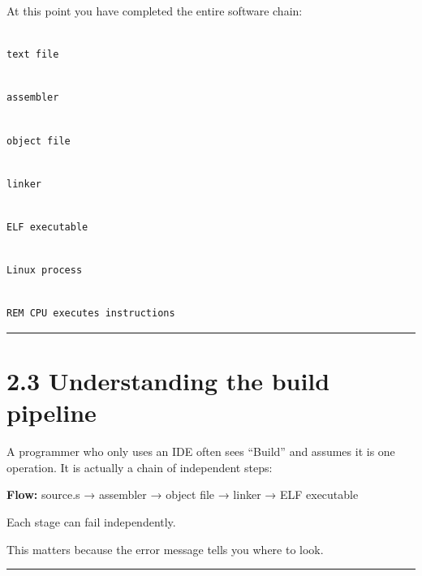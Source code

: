 \documentclass[
  oneside,
  openany]{book}
\begin{document}
At this point you have completed the entire software chain:

\begin{verbatim}

text file
\end{verbatim}

\begin{verbatim}

assembler
\end{verbatim}

\begin{verbatim}

object file
\end{verbatim}

\begin{verbatim}

linker
\end{verbatim}

\begin{verbatim}

ELF executable
\end{verbatim}

\begin{verbatim}

Linux process
\end{verbatim}

\begin{verbatim}

REM CPU executes instructions
\end{verbatim}

\begin{center}\rule{0.5\linewidth}{0.5pt}\end{center}

\hypertarget{understanding-the-build-pipeline}{%
\section{2.3 Understanding the build
pipeline}\label{understanding-the-build-pipeline}}

A programmer who only uses an IDE often sees ``Build'' and assumes it is
one operation. It is actually a chain of independent steps:

\textbf{Flow:} source.s → assembler → object file → linker → ELF
executable

Each stage can fail independently.

This matters because the error message tells you where to look.

\begin{center}\rule{0.5\linewidth}{0.5pt}\end{center}
\end{document}
